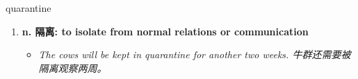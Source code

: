 
\begin{frame}
{\huge quarantine}
\begin{center}
\begin{enumerate}\Large
  \item \textbf{n. 隔离: to isolate from normal relations or communication}
  \begin{itemize}
    \item \em{\Large{The cows will be kept in quarantine for another two weeks. 牛群还需要被隔离观察两周。}}
  \end{itemize}
\end{enumerate}
\end{center}
\end{frame}
